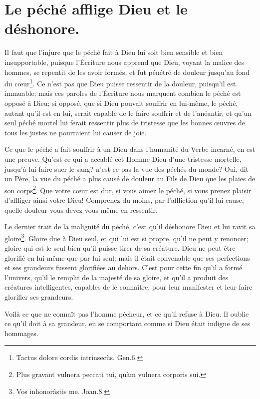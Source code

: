 \documentclass[instructions.tex]{subfiles}
\begin{document}
\chapter{Le péché afflige Dieu et le déshonore.}


\primo Il faut que l'injure que le péché fait à Dieu lui soit bien sensible et bien insupportable, puisque l'Écriture nous apprend que Dieu, voyant la malice des hommes, se repentit de les avoir formés, et fut pénétré de douleur jusqu'au fond du cœur\footnote{Tactus dolore cordis intrinsecùs. Gen.6.}. Ce n'est pas que Dieu puisse ressentir de la douleur, puisqu'il est immuable; mais ces paroles de l'Écriture nous marquent combien le péché est opposé à Dieu; si opposé, que si Dieu pouvait souffrir en lui-même, le péché, autant qu'il est en lui, serait capable de le faire souffrir et de l'anéantir, et qu'un seul péché mortel lui ferait ressentir plus de tristesse que les bonnes œuvres de tous les justes ne pourraient lui causer de joie.

Ce que le péché a fait souffrir à un Dieu dans l'humanité du Verbe incarné, en est une preuve. Qu'est-ce qui a accablé cet Homme-Dieu d'une tristesse mortelle, jusqu'à lui faire suer le sang? n'est-ce pas la vue des péchés du monde? Oui, dit un Père, la vue du péché a plus causé de douleur au Fils de Dieu que les plaies de son corps\footnote{Plus gravant vulnera peccati tui, quàm vulnera corporis sui.}. Que votre cœur est dur, si vous aimez le péché, si vous prenez plaisir d'affliger ainsi votre Dieu! Comprenez du moins, par l'affliction qu'il lui cause, quelle douleur vous devez vous-même en ressentir.


\secundo Le dernier trait de la malignité du péché, c'est qu'il déshonore Dieu et lui ravit sa gloire\footnote{Vos inhonorâstis me. Joan.8.}. Gloire due à Dieu seul, et qui lui est si propre, qu'il ne peut y renoncer; gloire qui est le seul bien qu'il puisse tirer de sa créature. Dieu ne peut être glorifié en lui-même que par lui seul; mais il était convenable que ses perfections et ses grandeurs fussent glorifiées au dehors. C'est pour cette fin qu'il a formé l'univers, qu'il le remplit de la majesté de sa gloire, et qu'il a produit des créatures intelligentes, capables de le connaître, pour leur manifester et leur faire glorifier ses grandeurs.

Voilà ce que ne connaît pas l'homme pécheur, et ce qu'il refuse à Dieu. Il oublie ce qu'il doit à sa grandeur, en se comportant comme si Dieu était indigne de ses hommages.
\end{document}
